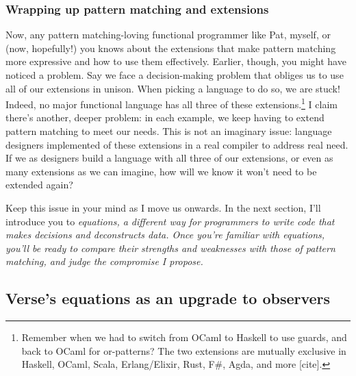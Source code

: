 \documentclass[manuscript,screen,review, 12pt]{acmart}
\begin{document}
    \subsubsection{Wrapping up pattern matching and extensions}
    Now, any pattern matching-loving functional programmer like Pat, myself, or
    (now, hopefully!) you knows about the extensions that make pattern matching
    more expressive and how to use them effectively. Earlier, though, you might
    have noticed a problem. Say we face a decision-making problem that obliges
    us to use all of our extensions in unison. When picking a language to do so,
    we are stuck! Indeed, no major functional language has all three of these
    extensions.\footnote{Remember when we had to switch from OCaml to Haskell to
    use guards, and back to OCaml for or-patterns? The two extensions are
    mutually exclusive in Haskell, OCaml, Scala, Erlang/Elixir, Rust, F\#, Agda,
    and more [cite].} I claim there's another, deeper problem: in each example,
    we keep having to extend pattern matching to meet our needs. This is not an
    imaginary issue: language designers implemented of these extensions in a
    real compiler to address real need. If we as designers build a language with
    all three of our extensions, or even as many extensions as we can imagine,
    how will we know it won't need to be extended again? 


    Keep this issue in your mind as I move us onwards. In the next section, I'll
    introduce you to \it{equations}, a different way for programmers to write
    code that makes decisions and deconstructs data. Once you're familiar with
    equations, you'll be ready to compare their strengths and weaknesses with
    those of pattern matching, and judge the compromise I propose.
    
    \subsection{Verse's equations as an upgrade to observers}
    \label{verseoverobservers}
    
\end{document}
